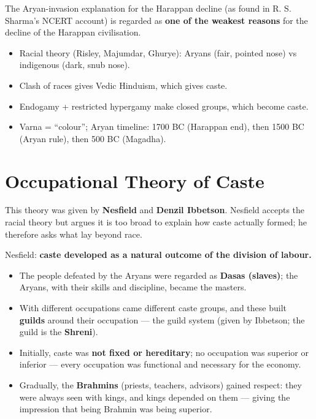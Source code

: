 \begin{CriticalPoint}
The Aryan-invasion explanation for the Harappan decline (as found in R. S. Sharma's NCERT account) is regarded as \textbf{one of the weakest reasons} for the decline of the Harappan civilisation.
\end{CriticalPoint}

\begin{QuickRevision}
\begin{itemize}
\item Racial theory (Risley, Majumdar, Ghurye): Aryans (fair, pointed nose) vs indigenous (dark, snub nose).
\item Clash of races gives Vedic Hinduism, which gives caste.
\item Endogamy + restricted hypergamy make closed groups, which become caste.
\item Varna = ``colour''; Aryan timeline: 1700 BC (Harappan end), then 1500 BC (Aryan rule), then 500 BC (Magadha).
\end{itemize}
\end{QuickRevision}

\section{Occupational Theory of Caste}

This theory was given by \textbf{Nesfield} and \textbf{Denzil Ibbetson}. Nesfield accepts the racial theory but argues it is too broad to explain how caste actually formed; he therefore asks what lay beyond race.

\begin{KeyConcept}
Nesfield: \textbf{caste developed as a natural outcome of the division of labour.}
\end{KeyConcept}

\begin{itemize}
\item The people defeated by the Aryans were regarded as \textbf{Dasas (slaves)}; the Aryans, with their skills and discipline, became the masters.
\item With different occupations came different caste groups, and these built \textbf{guilds} around their occupation --- the guild system (given by Ibbetson; the guild is the \textbf{Shreni}).
\item Initially, caste was \textbf{not fixed or hereditary}; no occupation was superior or inferior --- every occupation was functional and necessary for the economy.
\item Gradually, the \textbf{Brahmins} (priests, teachers, advisors) gained respect: they were always seen with kings, and kings depended on them --- giving the impression that being Brahmin was being superior.
\end{itemize}


